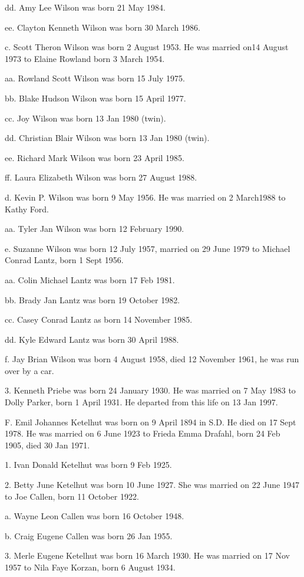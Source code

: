 \documentclass[a4paper]{article}
\begin{document}
dd. Amy Lee Wilson was born 21 May 1984.

ee. Clayton Kenneth Wilson was born 30 March 1986.

c. Scott Theron Wilson was born 2 August 1953.  He was married on14 August 1973 to Elaine Rowland born 3 March 1954.

aa. Rowland Scott Wilson was born 15 July 1975.

bb. Blake Hudson Wilson was born 15 April 1977.

cc. Joy Wilson was born 13 Jan 1980 (twin).

dd. Christian Blair Wilson was born 13 Jan 1980 (twin).

ee. Richard Mark Wilson was born 23 April 1985.

ff. Laura Elizabeth Wilson was born 27 August 1988.

d. Kevin P. Wilson was born 9 May 1956.  He was married on 2 March1988 to Kathy Ford.

aa. Tyler Jan Wilson was born 12 February 1990.

e. Suzanne Wilson was born 12 July 1957, married on 29 June 1979 to Michael Conrad Lantz, born 1 Sept 1956.

aa. Colin Michael Lantz was born 17 Feb 1981.

bb. Brady Jan Lantz was born 19 October 1982.

cc. Casey Conrad Lantz as born 14 November 1985.

dd. Kyle Edward Lantz was born 30 April 1988.

f. Jay Brian Wilson was born 4 August 1958, died 12 November 1961, he was run over by  a car.

3.  Kenneth Priebe was born 24 January 1930.  He was married on 7 May 1983 to Dolly Parker, born 1 April 1931.  He departed from this life on 13 Jan 1997.

F. Emil Johannes Ketelhut was born on 9 April 1894 in S.D.  He died on 17 Sept 1978. He was married on 6 June 1923 to Frieda Emma Drafahl, born 24 Feb 1905, died 30 Jan 1971.

1. Ivan Donald Ketelhut was born 9 Feb 1925.

2. Betty June Ketelhut was born 10 June 1927.  She was married on 22 June 1947 to Joe Callen, born 11 October 1922.

a. Wayne Leon Callen was born 16 October 1948.

b. Craig Eugene Callen was born 26 Jan 1955.

3. Merle Eugene Ketelhut was born 16 March 1930. He was married on 17 Nov 1957 to Nila Faye Korzan, born 6 August 1934.
\end{document}

